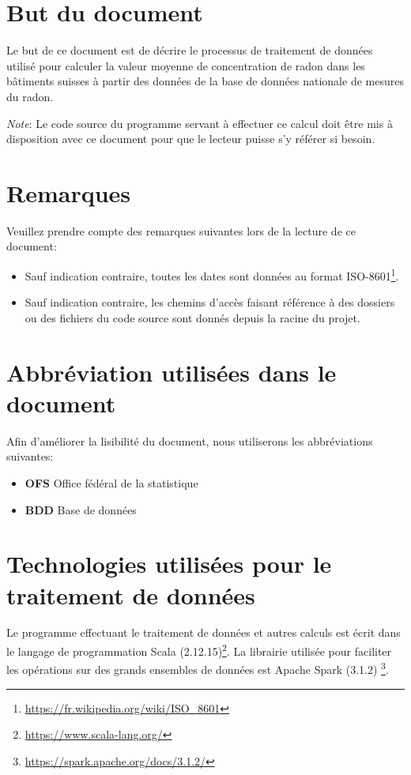 \section{But du document}
Le but de ce document est de décrire le processus de traitement de données utilisé pour calculer la valeur moyenne de concentration de radon dans les bâtiments suisses à partir des données de la base de données nationale de mesures du radon. 

\textit{Note}: Le code source du programme servant à effectuer ce calcul doit être mis à disposition avec ce document pour que le lecteur puisse s'y référer si besoin.

\section{Remarques}
Veuillez prendre compte des remarques suivantes lors de la lecture de ce document:
\begin{itemize}
\item Sauf indication contraire, toutes les dates sont données au format ISO-8601\footnote{\url{https://fr.wikipedia.org/wiki/ISO_8601}}.
\item Sauf indication contraire, les chemins d'accès faisant référence à des dossiers ou des fichiers du code source sont donnés depuis la racine du projet.
\end{itemize}

\section{Abbréviation utilisées dans le document}
Afin d'améliorer la lisibilité du document, nous utiliserons les abbréviations suivantes:

\begin{itemize}
\item \textbf{OFS} Office fédéral de la statistique
\item \textbf{BDD} Base de données
\end{itemize}

\section{Technologies utilisées pour le traitement de données}
Le programme effectuant le traitement de données et autres calculs est écrit dans le langage de programmation Scala (2.12.15)\footnote{\url{https://www.scala-lang.org/}}. La librairie utilisée pour faciliter les opérations sur des grands ensembles de données est Apache Spark (3.1.2) \footnote{\url{https://spark.apache.org/docs/3.1.2/}}. 

